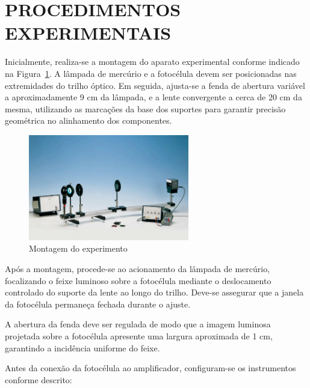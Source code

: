\documentclass[10pt,twocolumn,letterpaper]{article}
\begin{document}

\section{PROCEDIMENTOS EXPERIMENTAIS}

\hspace{1cm} Inicialmente, realiza-se a montagem do aparato experimental conforme indicado na Figura~\ref{fig:montagem}. A lâmpada de mercúrio e a fotocélula devem ser posicionadas nas extremidades do trilho óptico.
Em seguida, ajusta-se a fenda de abertura variável a aproximadamente 9 cm da lâmpada, e a lente convergente a cerca de 20 cm da mesma, utilizando as marcações da base dos suportes para garantir precisão geométrica no alinhamento dos componentes.

\begin{figure}[h]
    \centering
    \includegraphics[width=7cm]{Imagem1.png}
    \caption{Montagem do experimento}
    \label{fig:montagem}
\end{figure}

\hspace{1cm} Após a montagem, procede-se ao acionamento da lâmpada de mercúrio, focalizando o feixe luminoso sobre a fotocélula mediante o deslocamento controlado do suporte da lente ao longo do trilho. Deve-se assegurar que a janela da fotocélula permaneça fechada durante o ajuste.

\hspace{1cm} A abertura da fenda deve ser regulada de modo que a imagem luminosa projetada sobre a fotocélula apresente uma largura aproximada de 1 cm, garantindo a incidência uniforme do feixe.

\hspace{1cm} Antes da conexão da fotocélula ao amplificador, configuram-se os instrumentos conforme descrito:
\end{document}
